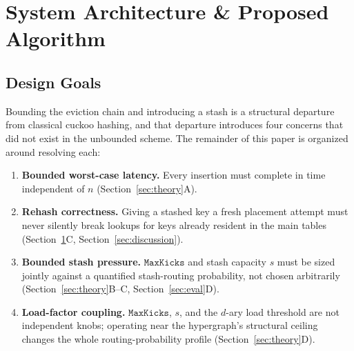 \documentclass[conference]{IEEEtran}
\begin{document}
	\section{System Architecture \& Proposed Algorithm}
	\label{sec:algorithm}
	
	\subsection{Design Goals}
	Bounding the eviction chain and introducing a stash is a structural
	departure from classical cuckoo hashing, and that departure introduces
	four concerns that did not exist in the unbounded scheme. The
	remainder of this paper is organized around resolving each:
	\begin{enumerate}
		\item[\textbf{G1}] \textbf{Bounded worst-case latency.} Every
		insertion must complete in time independent of $n$
		(Section~\ref{sec:theory}A).
		\item[\textbf{G2}] \textbf{Rehash correctness.} Giving a stashed key
		a fresh placement attempt must never silently break lookups for
		keys already resident in the main tables
		(Section~\ref{sec:algorithm}C, Section~\ref{sec:discussion}).
		\item[\textbf{G3}] \textbf{Bounded stash pressure.} $\mathtt{MaxKicks}$
		and stash capacity $s$ must be sized jointly against a quantified
		stash-routing probability, not chosen arbitrarily
		(Section~\ref{sec:theory}B--C, Section~\ref{sec:eval}D).
		\item[\textbf{G4}] \textbf{Load-factor coupling.} $\mathtt{MaxKicks}$,
		$s$, and the $d$-ary load threshold are not independent knobs;
		operating near the hypergraph's structural ceiling changes the
		whole routing-probability profile (Section~\ref{sec:theory}D).
	\end{enumerate}
	
\end{document}
